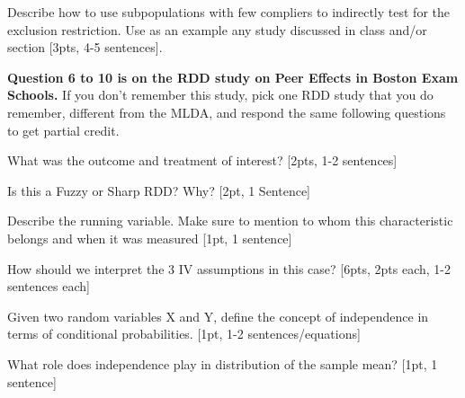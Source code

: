 \item Describe how to use subpopulations with few compliers to indirectly test for the exclusion restriction. Use as an example any study discussed in class and/or section [3pts, 4-5 sentences].
\vspace{4cm}


\textbf{Question 6 to 10 is on the RDD study on Peer Effects in Boston Exam Schools.} If you don’t remember this study, pick one RDD study that you do remember, different from the MLDA, and respond the same following questions to get partial credit.
\item What was the outcome and treatment of interest? [2pts, 1-2 sentences]

\vspace{4cm}
\item Is this a Fuzzy or Sharp RDD? Why? [2pt, 1 Sentence]
\vspace{4cm}
\item Describe the running variable. Make sure to mention to whom this characteristic belongs and when it was measured [1pt, 1 sentence]
\vspace{2cm}
\item How should we interpret the 3 IV assumptions in this case? [6pts, 2pts each, 1-2 sentences each]
\vspace{6cm}



\item Given two random variables X and Y, define the concept of independence in
terms of conditional probabilities. [1pt, 1-2 sentences/equations]
\vspace{3cm}

\item What role does independence play in distribution of the sample mean? [1pt, 1 sentence]
\vspace{3cm}